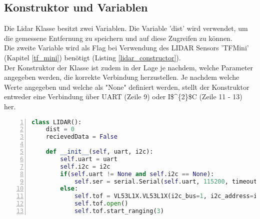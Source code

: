 \subsection{Konstruktor und Variablen}
Die Lidar Klasse besitzt zwei Variablen. Die Variable 'dist' wird verwendet, um die gemessene Entfernung zu speichern und auf diese Zugreifen zu können.\\
Die zweite Variable wird als Flag bei Verwendung des \ac{LIDAR} Sensors 'TFMini' (Kapitel \ref{tf_mini}) benötigt (Listing \ref{lidar_constructor}).\\
Der Konstruktor der Klasse ist zudem in der Lage je nachdem, welche Parameter angegeben werden, die korrekte Verbindung herzustellen. Je nachdem welche Werte angegeben und welche als "None"  definiert werden, stellt der Konstruktor entweder eine Verbindung über \ac{UART} (Zeile 9) oder \ac{I$^{2}$C} (Zeile 11 - 13) her. 
\begin{lstlisting}[caption={Kostruktor der Lidar Klasse}, language={Python}, label={lidar_constructor}, numbers=left]
class LIDAR():
    dist = 0
    recievedData = False

    def __init__(self, uart, i2c):
        self.uart = uart
        self.i2c = i2c
        if(self.uart != None and self.i2c == None):
            self.ser = serial.Serial(self.uart, 115200, timeout=1)
        else:
            self.tof = VL53L1X.VL53L1X(i2c_bus=1, i2c_address=i2c)
            self.tof.open()
            self.tof.start_ranging(3)
\end{lstlisting}
